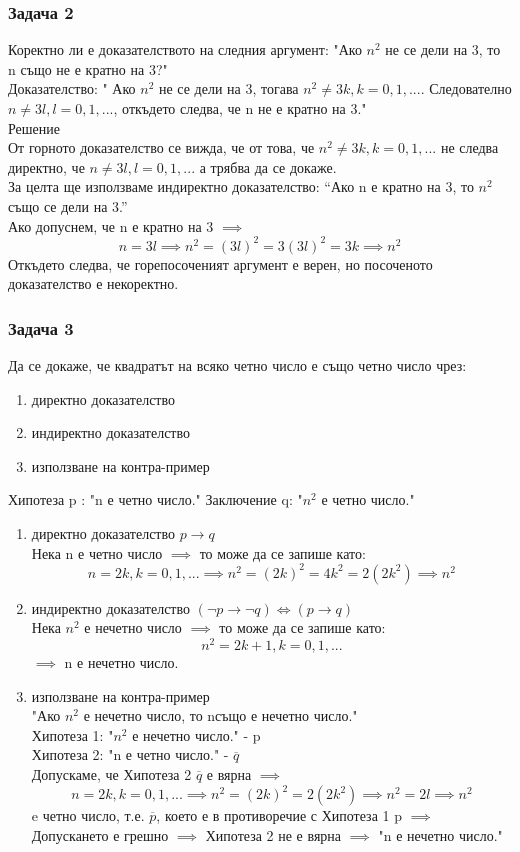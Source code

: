 \documentclass[fleqn, 12pt]{article}
\theoremstyle{definition}
\begin{document}
\subsubsection*{Задача 2}
Коректно ли е доказателството на следния аргумент: "Ако $n^2$ не се дели на 3, то n също не е кратно на 3?"\\ Доказателство: " Ако $n^2$ не се дели на 3, тогава $n^2 \neq 3k, k =0, 1, ...$. Следователно $n \neq 3l, l=0, 1, ...$, откъдето следва, че n не е кратно на 3."\\
Решение \\
От  горното  доказателство  се  вижда,  че  от  това,  че $n^2 \neq 3k, k =0, 1, ...$ не  следва директно, че $n \neq 3l, l=0, 1, ...$ а трябва да се докаже. \\
За целта ще използваме индиректно доказателство: “Ако n е кратно на 3, то $n^2$ също се дели на 3.” \\
Ако допуснем, че n е кратно на 3 $\implies$ 
$$n = 3l \implies n^2 = (3l)^2 = 3(3l)^2 = 3k \implies n^2$$
Откъдето следва, че горепосоченият аргумент е верен, но посоченото доказателство е некоректно.

\subsubsection*{Задача 3}
Да се докаже, че квадратът на всяко четно число е също четно число чрез:
\begin{enumerate}
\item директно доказателство
\item индиректно доказателство
\item използване на контра-пример
\end{enumerate}
Хипотеза p : "n е четно число."
Заключение q: "$n^2$ е четно число."
\begin{enumerate}
\item директно доказателство $p \to q$\\
Нека n е  четно  число $\implies$ то  може  да  се  запише  като:
$$n = 2k, k =0, 1, ... \implies n^2 = (2k)^2 = 4k^2 = 2(2k^2) \implies n^2$$ 

\item индиректно доказателство $(\neg p \to \neg q) \Leftrightarrow (p \to q)$\\
Нека $n^2$ е нечетно число $\implies$ то може да се запише като: 
$$n^2 = 2k+1, k =0, 1, ... $$
$\implies$  n е нечетно число.

\item използване на контра-пример \\
"Ако $n^2$ е нечетно число, то nсъщо е нечетно число." \\
Хипотеза 1: "$n^2$ е нечетно число." - p \\
Хипотеза 2:  "n е четно число." -  $\overline{q} $\\
Допускаме, че Хипотеза 2 $\overline{q} $ е вярна $\implies$
$$n =2k, k =0, 1, ... \implies n^2 = (2k)^2 = 2(2k^2) \implies n^2 = 2l \implies n^2$$
 e четно число, т.е. $\overline{p} $, което е в противоречие с Хипотеза 1 p $\implies$
Допускането е грешно $\implies$ Хипотеза 2 не е вярна $\implies$ "n е нечетно число."
\end{enumerate}
\end{document}
